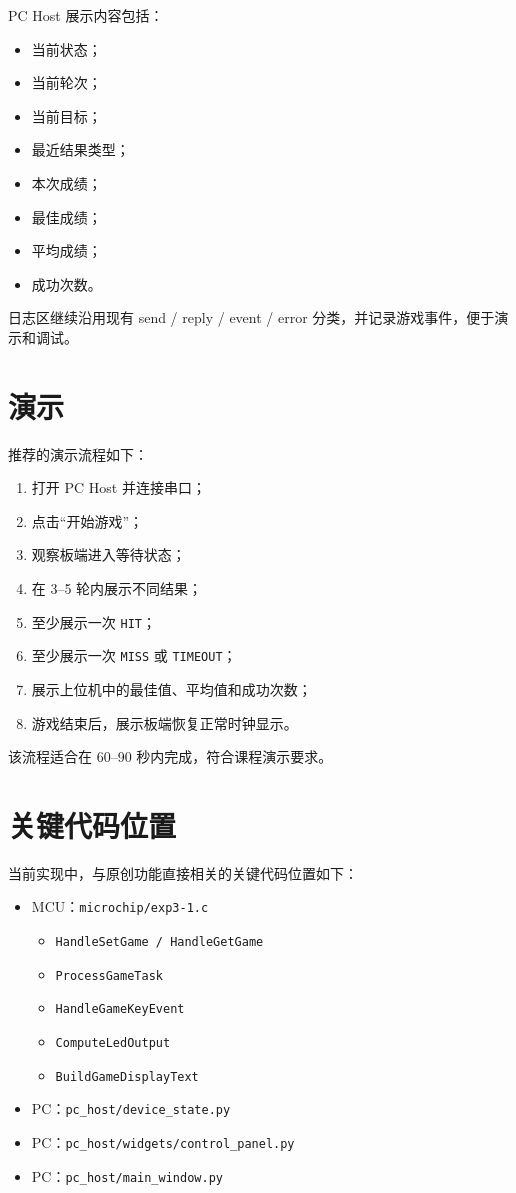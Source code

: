 \documentclass[main.tex]{subfiles}
\begin{document}
PC Host 展示内容包括：

\begin{itemize}[leftmargin=2em]
  \item 当前状态；
  \item 当前轮次；
  \item 当前目标；
  \item 最近结果类型；
  \item 本次成绩；
  \item 最佳成绩；
  \item 平均成绩；
  \item 成功次数。
\end{itemize}

日志区继续沿用现有 send / reply / event / error 分类，并记录游戏事件，便于演示和调试。

\section{演示}

推荐的演示流程如下：

\begin{enumerate}[leftmargin=2em]
  \item 打开 PC Host 并连接串口；
  \item 点击“开始游戏”；
  \item 观察板端进入等待状态；
  \item 在 3--5 轮内展示不同结果；
  \item 至少展示一次 \texttt{HIT}；
  \item 至少展示一次 \texttt{MISS} 或 \texttt{TIMEOUT}；
  \item 展示上位机中的最佳值、平均值和成功次数；
  \item 游戏结束后，展示板端恢复正常时钟显示。
\end{enumerate}

该流程适合在 60--90 秒内完成，符合课程演示要求。

\section{关键代码位置}

当前实现中，与原创功能直接相关的关键代码位置如下：

\begin{itemize}[leftmargin=2em]
  \item MCU：\texttt{microchip/exp3-1.c}
  \begin{itemize}[leftmargin=2em]
    \item \texttt{HandleSetGame / HandleGetGame}
    \item \texttt{ProcessGameTask}
    \item \texttt{HandleGameKeyEvent}
    \item \texttt{ComputeLedOutput}
    \item \texttt{BuildGameDisplayText}
  \end{itemize}
  \item PC：\texttt{pc\_host/device\_state.py}
  \item PC：\texttt{pc\_host/widgets/control\_panel.py}
  \item PC：\texttt{pc\_host/main\_window.py}
\end{itemize}
\end{document}
